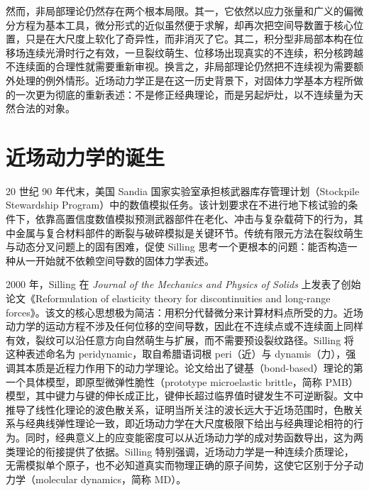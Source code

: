 然而，非局部理论仍然存在两个根本局限。其一，它依然以应力张量和广义的偏微分方程为基本工具，微分形式的近似虽然便于求解，却再次把空间导数置于核心位置，只是在大尺度上软化了奇异性，而非消灭了它。其二，积分型非局部本构在位移场连续光滑时行之有效，一旦裂纹萌生、位移场出现真实的不连续，积分核跨越不连续面的合理性就需要重新审视。换言之，非局部理论仍然把不连续视为需要额外处理的例外情形。近场动力学正是在这一历史背景下，对固体力学基本方程所做的一次更为彻底的重新表述：不是修正经典理论，而是另起炉灶，以不连续量为天然合法的对象。

\section{近场动力学的诞生}

20 世纪 90 年代末，美国 Sandia 国家实验室承担核武器库存管理计划（Stockpile Stewardship Program）中的数值模拟任务。该计划要求在不进行地下核试验的条件下，依靠高置信度数值模拟预测武器部件在老化、冲击与复杂载荷下的行为，其中金属与复合材料部件的断裂与破碎模拟是关键环节。传统有限元方法在裂纹萌生与动态分叉问题上的固有困难，促使 Silling 思考一个更根本的问题：能否构造一种从一开始就不依赖空间导数的固体力学表述。

2000 年，Silling 在 \textit{Journal of the Mechanics and Physics of Solids} 上发表了创始论文《Reformulation of elasticity theory for discontinuities and long-range forces》\cite{Silling2000}。该文的核心思想极为简洁：用积分代替微分来计算材料点所受的力。近场动力学的运动方程不涉及任何位移的空间导数，因此在不连续点或不连续面上同样有效，裂纹可以沿任意方向自然萌生与扩展，而不需要预设裂纹路径。Silling 将这种表述命名为 peridynamic，取自希腊语词根 peri（近）与 dynamis（力），强调其本质是近程力作用下的动力学理论。论文给出了键基（bond-based）理论的第一个具体模型，即原型微弹性脆性（prototype microelastic brittle，简称 PMB）模型，其中键力与键的伸长成正比，键伸长超过临界值时键发生不可逆断裂。文中推导了线性化理论的波色散关系，证明当所关注的波长远大于近场范围时，色散关系与经典线弹性理论一致，即近场动力学在大尺度极限下给出与经典理论相符的行为。同时，经典意义上的应变能密度可以从近场动力学的成对势函数导出，这为两类理论的衔接提供了依据。Silling 特别强调，近场动力学是一种连续介质理论，无需模拟单个原子，也不必知道真实而物理正确的原子间势，这使它区别于分子动力学（molecular dynamics，简称 MD）。

